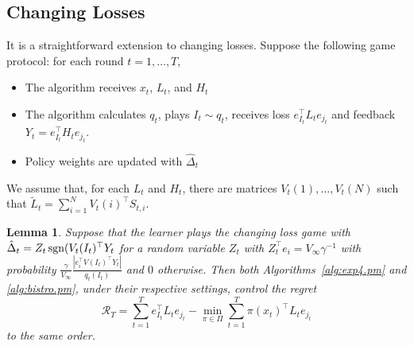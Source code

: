 \documentclass[11pt]{article}
\newcommand{\regret}{\mathcal{R}}
\newtheorem{lemma}{Lemma}
\begin{document}
\subsection{Changing Losses}
It is a straightforward extension to changing losses. Suppose the following game protocol: for each round $t=1,\ldots,T$,
\begin{itemize}
  \item The algorithm receives $x_t$, $L_t$, and $H_t$ 
  \item The algorithm calculates $q_t$, plays $I_t \sim q_t$, receives loss $e_{I_t}^\top L_t e_{j_t}$ and feedback $Y_t = e_{I_t}^\top H_t e_{j_t}$.
  \item Policy weights are updated with $\hat\Delta_t$
\end{itemize}
We assume that, for each $L_t$ and $H_t$, there are matrices $V_t(1),\ldots, V_t(N)$ such that $\tilde L_t = \sum_{i=1}^N V_t(i)^\top S_{t,i}$.

\begin{lemma}
  Suppose that the learner plays the changing loss game with $\hat\Delta_t = Z_t \operatorname*{sgn}(V_t(I_t)^\top Y_t$ for a random variable $Z_t$ with $Z_t^\top e_i = V_\infty \gamma^{-1}$ with probability $\frac{\gamma}{V_\infty} \frac{|e_i^\top V(I_t)^\top Y_t|}{q_t(I_t)}$ and $0$ otherwise.
  Then both Algorithms~\ref{alg:exp4.pm} and \ref{alg:bistro.pm}, under their respective settings, control the regret
\begin{equation}
  \regret_T = \sum_{t=1}^T e_{I_t}^\top L_{t}e_{j_t} - \min_{\pi\in\Pi}\sum_{t=1}^T \pi(x_t)^\top L_{t}e_{j_t}
\end{equation}
to the same order.  
\end{lemma}
\end{document}
